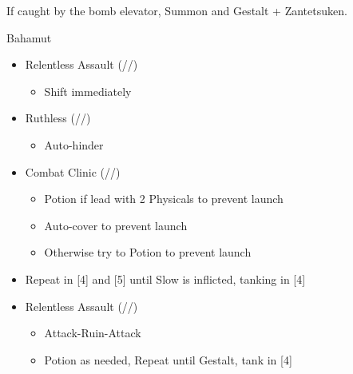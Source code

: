 	If caught by the bomb elevator, Summon and Gestalt + Zantetsuken.
	\renewcommand{\first}{[1] Relentless Assault (\com/\rav/\rav)}
	\renewcommand{\fifth}{[5] Ruthless (\sab/\com/\rav)
		\renewcommand{\fourth}{[4] Combat Clinic (\sen/\med/\med)}}
	\begin{battle}[0:50]{Bahamut}
		\begin{itemize}
			\item \first
			      \begin{itemize}
				      \item Shift immediately
			      \end{itemize}
			\item \fifth
			      \begin{itemize}
				      \item Auto-hinder
			      \end{itemize}
			\item \fourth
			      \begin{itemize}
				      \item Potion if lead with 2 Physicals to prevent launch
                                                 \item Auto-cover to prevent launch
				      \item Otherwise try to Potion to prevent launch
			      \end{itemize}
			\item Repeat in [4] and [5] until Slow is inflicted, tanking in [4]
			\item \first
			      \begin{itemize}
				      \item Attack-Ruin-Attack
				      \item Potion as needed, Repeat until Gestalt, tank in [4]
			      \end{itemize}
		\end{itemize}
	\end{battle}
	\vfill
	\ 
	\columnbreak
